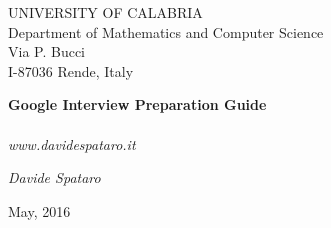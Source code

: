 \thispagestyle{empty}

\newcommand{\HS}[1][1.]{\hspace{\stretch{#1}}}
\begin{center}


\huge{UNIVERSITY OF CALABRIA}\\
\vspace*{0.25cm}
\large{Department of Mathematics and Computer Science}\\
\normalsize{Via P. Bucci\\
I-87036 Rende, Italy\\
\vspace*{0.25cm} \HS \hrulefill \HS}



\vspace*{3.5cm}

\Huge{\textbf{Google Interview Preparation Guide}}\\
\vspace*{0.2cm}
\large{\textbf{}}\\
\vspace*{0.7cm}
\Large{\textit{www.davidespataro.it}}
\vspace*{1cm}


\vspace*{1cm}

\normalsize{\textit{Davide Spataro}}

\vspace*{3.5cm}

\normalsize{May, 2016}

\vspace*{2.0cm}



\end{center}
